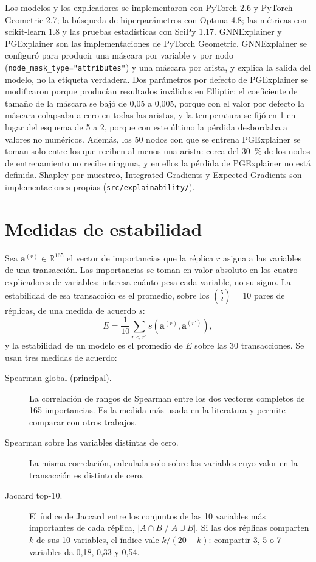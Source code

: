 Los modelos y los explicadores se implementaron con PyTorch 2.6 y PyTorch Geometric 2.7; la
búsqueda de hiperparámetros con Optuna 4.8; las métricas con scikit-learn 1.8 y las pruebas
estadísticas con SciPy 1.17. GNNExplainer y PGExplainer son las implementaciones de PyTorch
Geometric. GNNExplainer se configuró para producir una máscara por variable y por nodo
(\texttt{node\_mask\_type="attributes"}) y una máscara por arista, y explica la salida del
modelo, no la etiqueta verdadera. Dos parámetros por defecto de PGExplainer se modificaron
porque producían resultados inválidos en Elliptic: el coeficiente de tamaño de la máscara se
bajó de 0,05 a 0,005, porque con el valor por defecto la máscara colapsaba a cero en todas las
aristas, y la temperatura se fijó en 1 en lugar del esquema de 5 a 2, porque con este último
la pérdida desbordaba a valores no numéricos. Además, los 50 nodos con que se entrena
PGExplainer se toman solo entre los que reciben al menos una arista: cerca del 30~\% de los
nodos de entrenamiento no recibe ninguna, y en ellos la pérdida de PGExplainer no está definida.
Shapley por muestreo, Integrated Gradients y Expected Gradients son implementaciones propias
(\texttt{src/explainability/}).

\section{Medidas de estabilidad}\label{sec:medidas}

Sea $\mathbf{a}^{(r)} \in \mathbb{R}^{165}$ el vector de importancias que la réplica $r$
asigna a las variables de una transacción. Las importancias se toman en valor absoluto en los
cuatro explicadores de variables: interesa cuánto pesa cada variable, no su signo. La estabilidad de esa transacción es el promedio,
sobre los $\binom{5}{2} = 10$ pares de réplicas, de una medida de acuerdo $s$:
\begin{equation}
  E = \frac{1}{10} \sum_{r < r'} s\!\left(\mathbf{a}^{(r)}, \mathbf{a}^{(r')}\right),
\end{equation}
y la estabilidad de un modelo es el promedio de $E$ sobre las 30 transacciones. Se usan tres
medidas de acuerdo:

\begin{description}
  \item[Spearman global (principal).] La correlación de rangos de Spearman
        \cite{Spearman1904} entre los dos vectores completos de 165 importancias. Es la medida
        más usada en la literatura y permite comparar con otros trabajos.
  \item[Spearman sobre las variables distintas de cero.] La misma correlación, calculada solo
        sobre las variables cuyo valor en la transacción es distinto de cero.
  \item[Jaccard top-10.] El índice de Jaccard \cite{Jaccard1912} entre los conjuntos de las 10
        variables más importantes de cada réplica, $|A \cap B| / |A \cup B|$. Si las dos
        réplicas comparten $k$ de sus 10 variables, el índice vale $k / (20 - k)$: compartir
        3, 5 o 7 variables da 0,18, 0,33 y 0,54.
\end{description}

